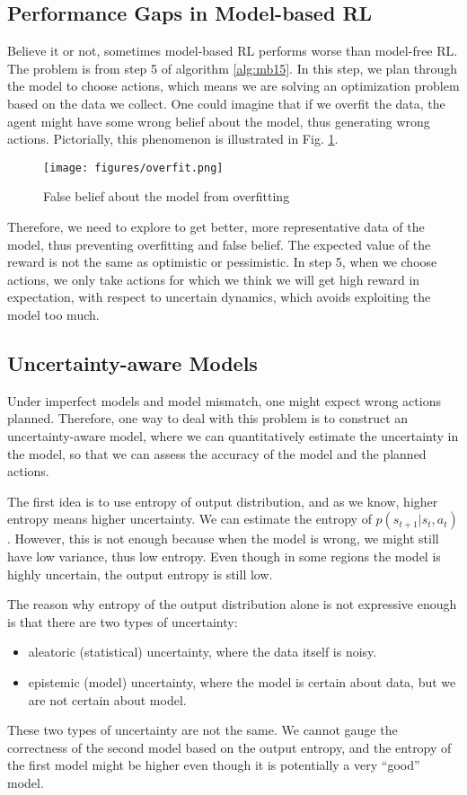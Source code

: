 \subsection{Performance Gaps in Model-based RL}
Believe it or not, sometimes model-based RL performs worse than model-free RL. The problem is from step 5 of algorithm \ref{alg:mb15}. In this step, we plan through the model to choose actions, which means we are solving an optimization problem based on the data we collect. One could imagine that if we overfit the data, the agent might have some wrong belief about the model, thus generating wrong actions. Pictorially, this phenomenon is illustrated in Fig. \ref{fig:overfit}.
\begin{figure}
    \centering
    \texttt{[image: figures/overfit.png]}
    \caption{False belief about the model from overfitting}
    \label{fig:overfit}
\end{figure}

Therefore, we need to explore to get better, more representative data of the model, thus preventing overfitting and false belief. The expected value of the reward is not the same as optimistic or pessimistic. In step 5, when we choose actions, we only take actions for which we think we will get high reward in expectation, with respect to uncertain dynamics, which avoids exploiting the model too much.

\subsection{Uncertainty-aware Models}
Under imperfect models and model mismatch, one might expect wrong actions planned. Therefore, one way to deal with this problem is to construct an uncertainty-aware model, where we can quantitatively estimate the uncertainty in the model, so that we can assess the accuracy of the model and the planned actions. 

The first idea is to use entropy of output distribution, and as we know, higher entropy means higher uncertainty. We can estimate the entropy of $p(s_{t+1}|s_t,a_t)$. However, this is not enough because when the model is wrong, we might still have low variance, thus low entropy. Even though in some regions the model is highly uncertain, the output entropy is still low.

The reason why entropy of the output distribution alone is not expressive enough is that there are two types of uncertainty:
\begin{itemize}
    \item aleatoric (statistical) uncertainty, where the data itself is noisy.
    \item epistemic (model) uncertainty, where the model is certain about data, but we are not certain about model.
\end{itemize}
These two types of uncertainty are not the same. We cannot gauge the correctness of the second model based on the output entropy, and the entropy of the first model might be higher even though it is potentially a very ``good'' model. 

